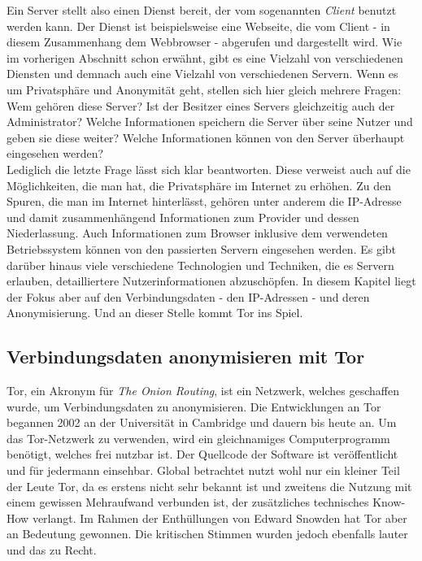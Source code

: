 Ein Server stellt also einen Dienst bereit, der vom sogenannten \textit{Client} benutzt werden kann.
Der Dienst ist beispielsweise eine Webseite, die vom Client - in diesem Zusammenhang dem Webbrowser - abgerufen und dargestellt wird.
Wie im vorherigen Abschnitt schon erwähnt, gibt es eine Vielzahl von verschiedenen Diensten und demnach auch eine Vielzahl von verschiedenen Servern.
Wenn es um Privatsphäre und Anonymität geht, stellen sich hier gleich mehrere Fragen:
Wem gehören diese Server?
Ist der Besitzer eines Servers gleichzeitig auch der Administrator?
Welche Informationen speichern die Server über seine Nutzer und geben sie diese weiter?
Welche Informationen können von den Server überhaupt eingesehen werden?
\\
Lediglich die letzte Frage lässt sich klar beantworten.
Diese verweist auch auf die Möglichkeiten, die man hat, die Privatsphäre im Internet zu erhöhen.
Zu den Spuren, die man im Internet hinterlässt, gehören unter anderem die IP-Adresse und damit zusammenhängend Informationen zum Provider und dessen Niederlassung.
Auch Informationen zum Browser inklusive dem verwendeten Betriebssystem können von den passierten Servern eingesehen werden.
Es gibt darüber hinaus viele verschiedene Technologien und Techniken, die es Servern erlauben, detailliertere Nutzerinformationen abzuschöpfen.
In diesem Kapitel liegt der Fokus aber auf den Verbindungsdaten - den IP-Adressen - und deren Anonymisierung.
Und an dieser Stelle kommt Tor ins Spiel.

\subsection{Verbindungsdaten anonymisieren mit Tor}
Tor, ein Akronym für \textit{The Onion Routing}, ist ein Netzwerk, welches geschaffen wurde, um Verbindungsdaten zu anonymisieren.
Die Entwicklungen an Tor begannen 2002 an der Universität in Cambridge und dauern bis heute an. Um das Tor-Netzwerk zu verwenden, wird ein gleichnamiges Computerprogramm benötigt, welches frei nutzbar ist. Der Quellcode der Software ist veröffentlicht und für jedermann einsehbar.
Global betrachtet nutzt wohl nur ein kleiner Teil der Leute Tor, da es erstens nicht sehr bekannt ist und zweitens die Nutzung mit einem gewissen Mehraufwand verbunden ist, der zusätzliches technisches Know-How verlangt. Im Rahmen der Enthüllungen von Edward Snowden hat Tor aber an Bedeutung gewonnen. Die kritischen Stimmen wurden jedoch ebenfalls lauter und das zu Recht.

